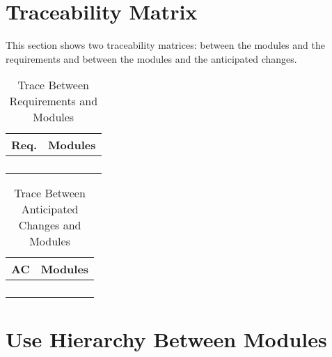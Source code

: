 \documentclass[12pt]{article}
\begin{document}
\section{Traceability Matrix}
This section shows two traceability matrices: between the modules and 
the 
requirements and between the modules and the anticipated changes. 
\smallskip
\begin{table}[!htbp]
	\centering
	\begin{tabular}{p{3cm}|p{9cm}}
		\textbf{Req.} & \textbf{Modules} \\\hline
		&  \\
		&  \\
		&  \\
		&  \\\hline
	\end{tabular}
	\caption{Trace Between Requirements and Modules}
	\label{Trace Between Requirements and Modules}
\end{table}
\begin{table}[!htbp]
	\centering
	\begin{tabular}{p{3cm}|p{9cm}}
		\textbf{AC} & \textbf{Modules} \\\hline
		&  \\
		&  \\
		&  \\
		&  \\\hline
	\end{tabular}
	\caption{Trace Between Anticipated Changes and Modules}
	\label{Trace Between Anticipated Changes and Modules}
\end{table}
\smallskip
\section{Use Hierarchy Between Modules}
\end{document}
